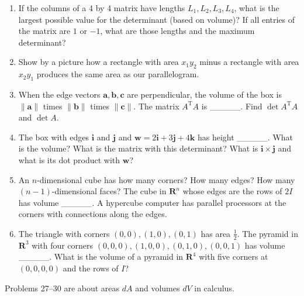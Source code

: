 \documentclass[14pt, a4paper]{article}
\begin{document}
\begin{enumerate}[resume]
    \item If the columns of a 4 by 4 matrix have lengths $L_1, L_2, L_3, L_4$, what is the largest possible value for the determinant (based on volume)? If all entries of the matrix are $1$ or $-1$, what are those lengths and the maximum determinant?

    \item Show by a picture how a rectangle with area $x_1y_2$ minus a rectangle with area $x_2y_1$ produces the same area as our parallelogram.

    \item When the edge vectors $\boldsymbol{a}, \boldsymbol{b}, \boldsymbol{c}$ are perpendicular, the volume of the box is $\|\boldsymbol{a}\|$ times $\|\boldsymbol{b}\|$ times $\|\boldsymbol{c}\|$. The matrix $A^{\text{T}}A$ is \_\_\_\_\_. Find $\det A^{\text{T}}A$ and $\det A$.

    \item The box with edges $\boldsymbol{i}$ and $\boldsymbol{j}$ and $\boldsymbol{w} = 2\boldsymbol{i} + 3\boldsymbol{j} + 4\boldsymbol{k}$ has height \_\_\_\_\_. What is the volume? What is the matrix with this determinant? What is $\boldsymbol{i} \times \boldsymbol{j}$ and what is its dot product with $\boldsymbol{w}$?

    \item An $n$-dimensional cube has how many corners? How many edges? How many $(n-1)$-dimensional faces? The cube in $\mathbf{R}^n$ whose edges are the rows of $2I$ has volume \_\_\_\_\_. A hypercube computer has parallel processors at the corners with connections along the edges.

    \item The triangle with corners $(0, 0), (1, 0), (0, 1)$ has area $\frac{1}{2}$. The pyramid in $\mathbf{R}^3$ with four corners $(0, 0, 0), (1, 0, 0), (0, 1, 0), (0, 0, 1)$ has volume \_\_\_\_\_. What is the volume of a pyramid in $\mathbf{R}^4$ with five corners at $(0, 0, 0, 0)$ and the rows of $I$?
\end{enumerate}

\noindent Problems 27--30 are about areas $dA$ and volumes $dV$ in calculus.
\end{document}
